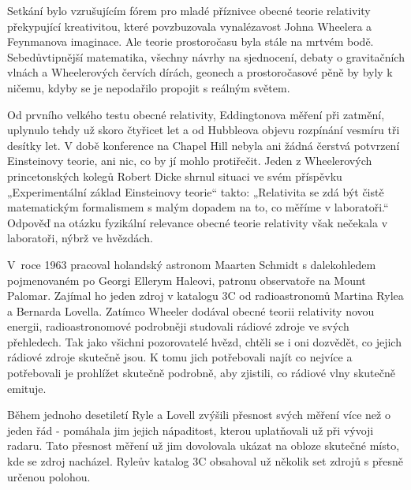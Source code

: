   Setkání bylo vzrušujícím fórem pro mladé příznivce obecné teorie relativity překypující
  kreativitou, které povzbuzovala vynalézavost Johna Wheelera a Feynmanova imaginace. Ale teorie
  prostoročasu byla stále na mrtvém bodě. Sebedůvtipnější matematika, všechny návrhy na sjednocení,
  debaty o gravitačních vlnách a Wheelerových červích dírách, geonech a prostoročasové pěně by byly
  k ničemu, kdyby se je nepodařilo propojit s reálným světem. 

  Od prvního velkého testu obecné relativity, Eddingtonova měření při zatmění, uplynulo tehdy už
  skoro čtyřicet let a od Hubbleova objevu rozpínání vesmíru tři desítky let. V době konference na
  Chapel Hill nebyla ani žádná čerstvá potvrzení Einsteinovy teorie, ani nic, co by jí mohlo
  protiřečit. Jeden z Wheelerových princetonských kolegů Robert Dicke shrnul situaci ve svém
  příspěvku „Experimentální základ Einsteinovy teorie“ takto: „Relativita se zdá být čistě
  matematickým formalismem s malým dopadem na to, co měříme v laboratoři.“ Odpověď na otázku
  fyzikální relevance obecné teorie relativity však nečekala v laboratoři, nýbrž ve hvězdách.

  V roce 1963 pracoval holandský astronom Maarten Schmidt s dalekohledem pojmenovaném po Georgi
  Ellerym Haleovi, patronu observatoře na Mount Palomar. Zajímal ho jeden zdroj v katalogu 3C od
  radioastronomů Martina Rylea a Bernarda Lovella. Zatímco Wheeler dodával obecné teorii relativity
  novou energii, radioastronomové podrobněji studovali rádiové zdroje ve svých přehledech. Tak jako
  všichni pozorovatelé hvězd, chtěli se i oni dozvědět, co jejich rádiové zdroje skutečně jsou. K
  tomu jich potřebovali najít co nejvíce a potřebovali je prohlížet skutečně podrobně, aby zjistili,
  co rádiové vlny skutečně emituje. 

  Během jednoho desetiletí Ryle a Lovell zvýšili přesnost svých měření více než o jeden řád -
  pomáhala jim jejich nápaditost, kterou uplatňovali už při vývoji radaru. Tato přesnost měření už
  jim dovolovala ukázat na obloze skutečné místo, kde se zdroj nacházel. Ryleův katalog 3C obsahoval
  už několik set zdrojů s přesně určenou polohou. 

